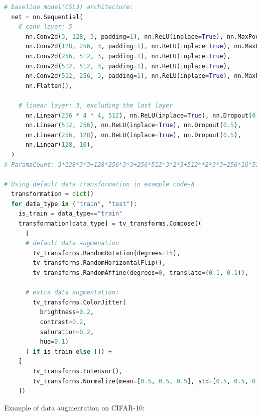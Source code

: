 \documentclass{article}
\begin{document}
\begin{lstlisting}[language=python]
  # baseline model(C5L3) architecture:  
  net = nn.Sequential(
    # conv layer: 5
      nn.Conv2d(3, 128, 3, padding=1), nn.ReLU(inplace=True), nn.MaxPool2d(2), nn.Dropout(0.3),
      nn.Conv2d(128, 256, 3, padding=1), nn.ReLU(inplace=True), nn.MaxPool2d(2), nn.Dropout(0.3),
      nn.Conv2d(256, 512, 3, padding=1), nn.ReLU(inplace=True),
      nn.Conv2d(512, 512, 3, padding=1), nn.ReLU(inplace=True),
      nn.Conv2d(512, 256, 3, padding=1), nn.ReLU(inplace=True), nn.MaxPool2d(2), nn.Dropout(0.3),
      nn.Flatten(),

    # linear layer: 3, excluding the last layer
      nn.Linear(256 * 4 * 4, 512), nn.ReLU(inplace=True), nn.Dropout(0.5),
      nn.Linear(512, 256), nn.ReLU(inplace=True), nn.Dropout(0.5),
      nn.Linear(256, 128), nn.ReLU(inplace=True), nn.Dropout(0.5),
      nn.Linear(128, 10),
  )
# ParamsCount: 3*128*3*3+128*256*3*3+256*512*3*2*3+512**2*3*3+256*16*512+512*256+256*128+1280=7.28M

# Using default data transformation in example code-A
  transformation = dict()
  for data_type in ("train", "test"):
    is_train = data_type=="train"
    transformation[data_type] = tv_transforms.Compose((
      [
      # default data augmenation
        tv_transforms.RandomRotation(degrees=15),
        tv_transforms.RandomHorizontalFlip(),
        tv_transforms.RandomAffine(degrees=0, translate=(0.1, 0.1)),
      
      # extra data augmentation:
        tv_transforms.ColorJitter(
          brightness=0.2, 
          contrast=0.2,
          saturation=0.2,
          hue=0.1)
      ] if is_train else []) + 
    [
        tv_transforms.ToTensor(),
        tv_transforms.Normalize(mean=[0.5, 0.5, 0.5], std=[0.5, 0.5, 0.5]),
    ])
\end{lstlisting}





\noindent Example of data augmentation on CIFAR-10:
\end{document}
